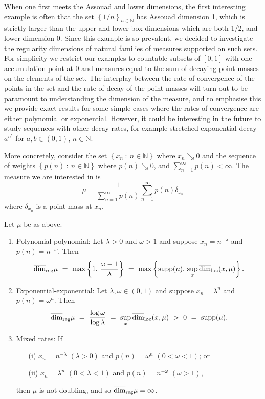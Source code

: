 When one first meets the Assouad and lower dimensions, the first interesting example is often that the set $\left\{1/n \right\}_{n\in \mathbb{N}}$ has Assouad dimension 1, which is strictly larger than the upper and lower box dimensions which are both 1/2, and lower dimension 0. Since this example is so prevalent, we decided to investigate the regularity dimensions of natural families of measures supported on such sets. For simplicity we restrict our examples to countable subsets of $[0,1]$ with one accumulation point at 0 and measures equal to the sum of decaying point masses on the elements of the set. The interplay between the rate of convergence of the points in the set and the rate of decay of the point masses will turn out to be paramount to understanding the dimension of the measure, and to emphasise this we provide exact results for some simple cases where the rates of convergence are either polynomial or exponential.  However, it could be interesting in the future to study  sequences with other decay rates, for example  stretched exponential decay $a^{n^b}$ for $a,b \in (0,1)$, $n \in \mathbb{N}$.

More concretely, consider the set $\left\{ x_n \ : \ n \in \mathbb{N}\right\}$ where  $x_n  \searrow 0$ and the sequence of weights $\left\{ p(n) \ : \ n \in \mathbb{N} \right\}$ where $p(n) \searrow 0$, and $\sum_{n=1}^\infty p(n) < \infty$.  The measure we are interested in is
\[
\mu = \frac{1}{\sum_{n=1}^\infty p(n) } \sum_{n=1}^\infty p(n)\delta_{x_n} 
\]
where $\delta_{x_n} $ is a point mass at $x_n$.

\begin{theorem}\label{ch-upper-reg:sequences}
	Let $\mu$ be as above.
	\begin{enumerate}
		\item Polynomial-polynomial: Let $\lambda > 0$ and $\omega > 1$ and suppose $x_n = n^{-\lambda}$ and $p(n)=n^{-\omega}$.  Then
		\[
		\overline{\dim}_{\textup{reg}} \mu \ = \  \max \left\{1, \, \frac{\omega-1}{\lambda}\right\} \  =\  \max \left\{ \textup{supp} (\mu), \, \sup_x \overline{\dim}_{\textrm{loc}}(x,\mu)\right\}.
		\]
		\item Exponential-exponential: Let $\lambda, \omega \in (0,1)$ and suppose $x_n= \lambda^{n}$ and $p(n)=\omega^{n}$.  Then
		\[
		\r \ = \  \frac{\log \omega}{\log \lambda}  \ = \ \sup_x \overline{\dim}_{\textup{loc}}(x,\mu) \ >  \     0 \ = \ \textup{supp} (\mu) .
		\]
		\item Mixed rates: If
		\begin{enumerate}
			\item[(i)] $x_n = n^{-\lambda}$ $(\lambda >0)$ and $p(n)=\omega^{n}$ $(0< \omega < 1)$; or
			\item[(ii)]  $x_n =  \lambda^{n}$ $(0< \lambda < 1)$ and $p(n)=n^{-\omega}$ $(\omega >1)$,
		\end{enumerate}
		then $\mu$ is not doubling, and so  $\overline{\dim}_{\textup{reg}} \mu = \infty$.
	\end{enumerate}
\end{theorem}


